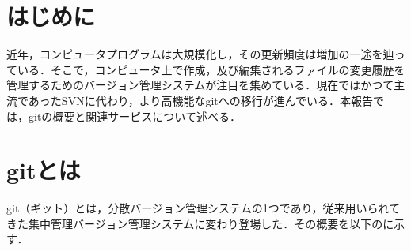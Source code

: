 \documentclass[a4paper,10pt,twocolumn]{jsarticle}
\begin{document}


\section{はじめに}
近年，コンピュータプログラムは大規模化し，その更新頻度は増加の一途を辿っている．そこで，コンピュータ上で作成，及び編集されるファイルの変更履歴を管理するためのバージョン管理システムが注目を集めている．現在ではかつて主流であったSVNに代わり，より高機能なgitへの移行が進んでいる．本報告では，gitの概要と関連サービスについて述べる．

\section{gitとは}
git（ギット）とは，分散バージョン管理システムの1つであり，従来用いられてきた集中管理バージョン管理システムに変わり登場した．その概要を以下のに示す．
\end{document}
